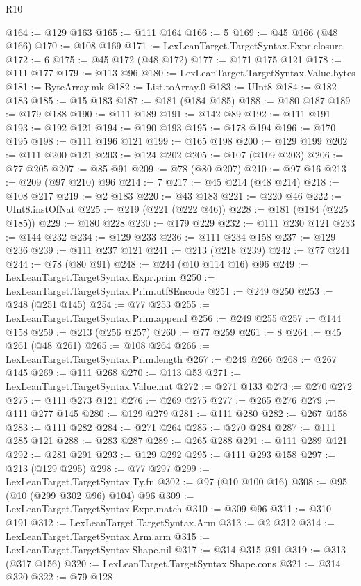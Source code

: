 \begin{lexlean}{R10}
\begin{coremodule}
{{{{{{{{{{{{{{{{{{{{{{{{{{{{{{{{{{{{{{{{{{{{{{{{{{{{{{{{{{{{{{{{{{{{{{{{{{{{{{{{{{{{{{{{{{{{{{{{{{{{{{{{{{{{@164 := @129 @163
@165 := @111 @164
@166 := 5
@169 := @45 @166 (@48 @166)
@170 := @108 @169
@171 := LexLeanTarget.TargetSyntax.Expr.closure
@172 := 6
@175 := @45 @172 (@48 @172)
@177 := @171 @175 @121
@178 := @111 @177
@179 := @113 @96
@180 := LexLeanTarget.TargetSyntax.Value.bytes
@181 := ByteArray.mk
@182 := List.toArray.{0}
@183 := UInt8
@184 := @182 @183
@185 := @15 @183
@187 := @181 (@184 @185)
@188 := @180 @187
@189 := @179 @188
@190 := @111 @189
@191 := @142 @89
@192 := @111 @191
@193 := @192 @121
@194 := @190 @193
@195 := @178 @194
@196 := @170 @195
@198 := @111 @196 @121
@199 := @165 @198
@200 := @129 @199
@202 := @111 @200 @121
@203 := @124 @202
@205 := @107 (@109 @203)
@206 := @77 @205
@207 := @85 @91
@209 := @78 (@80 @207)
@210 := @97 @16
@213 := @209 (@97 @210) @96
@214 := 7
@217 := @45 @214 (@48 @214)
@218 := @108 @217
@219 := @2 @183
@220 := @43 @183
@221 := @220 @46
@222 := UInt8.instOfNat
@225 := @219 (@221 (@222 @46))
@228 := @181 (@184 (@225 @185))
@229 := @180 @228
@230 := @179 @229
@232 := @111 @230 @121
@233 := @144 @232
@234 := @129 @233
@236 := @111 @234 @158
@237 := @129 @236
@239 := @111 @237 @121
@241 := @213 (@218 @239)
@242 := @77 @241
@244 := @78 (@80 @91)
@248 := @244 (@10 @114 @16) @96
@249 := LexLeanTarget.TargetSyntax.Expr.prim
@250 := LexLeanTarget.TargetSyntax.Prim.utf8Encode
@251 := @249 @250
@253 := @248 (@251 @145)
@254 := @77 @253
@255 := LexLeanTarget.TargetSyntax.Prim.append
@256 := @249 @255
@257 := @144 @158
@259 := @213 (@256 @257)
@260 := @77 @259
@261 := 8
@264 := @45 @261 (@48 @261)
@265 := @108 @264
@266 := LexLeanTarget.TargetSyntax.Prim.length
@267 := @249 @266
@268 := @267 @145
@269 := @111 @268
@270 := @113 @53
@271 := LexLeanTarget.TargetSyntax.Value.nat
@272 := @271 @133
@273 := @270 @272
@275 := @111 @273 @121
@276 := @269 @275
@277 := @265 @276
@279 := @111 @277 @145
@280 := @129 @279
@281 := @111 @280
@282 := @267 @158
@283 := @111 @282
@284 := @271 @264
@285 := @270 @284
@287 := @111 @285 @121
@288 := @283 @287
@289 := @265 @288
@291 := @111 @289 @121
@292 := @281 @291
@293 := @129 @292
@295 := @111 @293 @158
@297 := @213 (@129 @295)
@298 := @77 @297
@299 := LexLeanTarget.TargetSyntax.Ty.fn
@302 := @97 (@10 @100 @16)
@308 := @95 (@10 (@299 @302 @96) @104) @96
@309 := LexLeanTarget.TargetSyntax.Expr.match
@310 := @309 @96
@311 := @310 @191
@312 := LexLeanTarget.TargetSyntax.Arm
@313 := @2 @312
@314 := LexLeanTarget.TargetSyntax.Arm.arm
@315 := LexLeanTarget.TargetSyntax.Shape.nil
@317 := @314 @315 @91
@319 := @313 (@317 @156)
@320 := LexLeanTarget.TargetSyntax.Shape.cons
@321 := @314 @320
@322 := @79 @128
}}}}}}}}}}}}}}}}}}}}}}}}}}}}}}}}}}}}}}}}}}}}}}}}}}}}}}}}}}}}}}}}}}}}}}}}}}}}}}}}}}}}}}}}}}}}}}}}}}}}}}}}}}}}
\end{coremodule}
\end{lexlean}
